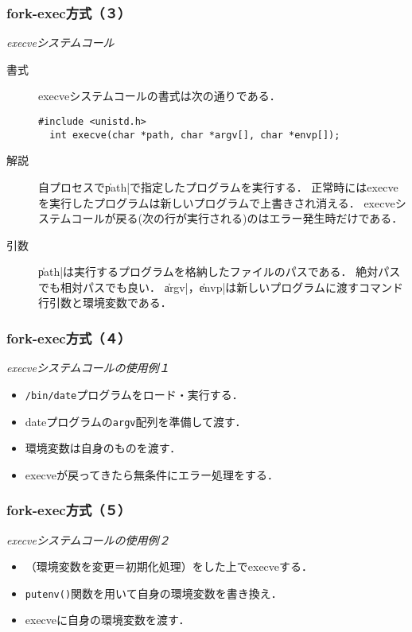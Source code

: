 \documentclass{beamer}                 %
\begin{document}
\begin{frame}[fragile]
  \frametitle{fork-exec方式（３）}
  \emph{execveシステムコール} \\
  \begin{description}
  \item[書式] execveシステムコールの書式は次の通りである．
\begin{lstlisting}[numbers=none]
  #include <unistd.h>
  int execve(char *path, char *argv[], char *envp[]);
\end{lstlisting}

  \item[解説]
    自プロセスで\|path|で指定したプログラムを実行する．
    正常時にはexecveを実行したプログラムは新しいプログラムで上書きされ消える．
    execveシステムコールが戻る(次の行が実行される)のはエラー発生時だけである．

  \item[引数]
    \|path|は実行するプログラムを格納したファイルのパスである．
    絶対パスでも相対パスでも良い．
    \|argv|，\|envp|は新しいプログラムに渡すコマンド行引数と環境変数である．
  \end{description}
  \vfill
\end{frame}

\begin{frame}[fragile]
  \frametitle{fork-exec方式（４）}
  \emph{execveシステムコールの使用例１} \\
  \begin{itemize}
  \item \texttt{/bin/date}プログラムをロード・実行する．
  \item dateプログラムの\texttt{argv}配列を準備して渡す．
  \item 環境変数は自身のものを渡す．
  \item execveが戻ってきたら無条件にエラー処理をする．
  \end{itemize}
  \vfill
\end{frame}

\begin{frame}[fragile]
  \frametitle{fork-exec方式（５）}
  \emph{execveシステムコールの使用例２} \\
  \begin{itemize}
  \item （環境変数を変更＝初期化処理）をした上でexecveする．
  \item \texttt{putenv()}関数を用いて自身の環境変数を書き換え．
  \item execveに自身の環境変数を渡す．
  \end{itemize}
  \vfill
\end{frame}
\end{document}

